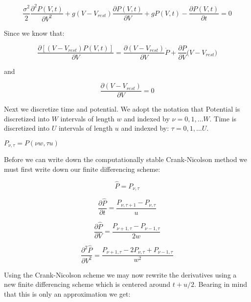 \documentclass[10pt]{article}
\begin{document}
\begin{equation}
    \frac{\sigma^2}{2} \frac{\partial^2 P(V,t) } {\partial V^2} +
    g(V-V_{rest})\frac{\partial P(V,t)}{\partial V} +
    gP(V,t) -
    \frac{\partial P(V,t)}{\partial t} = 
    0
\end{equation}

Since we know that:

\begin{equation}
    \frac{\partial[(V-V_{rest})P(V,t)]}{\partial V} =
    \frac{\partial (V-V_{rest})}{\partial V} \dot P +
    \frac{\partial P}{\partial V} \dot (V-V_{rest})
\end{equation}

and

\begin{equation}
    \frac{\partial (V-V_{rest})}{\partial V} = 0 
\end{equation}


Next we discretize time and potential. We adopt the notation that
Potential is discretized into $W$ intervals of length $w$ and indexed
by $\nu= 0,1, \dots W $.  Time is discretized  into $U$ intervals of
length $u$ and indexed by: $\tau= 0,1, \dots U $.



$P_{\nu,\tau} = P(\nu w,\tau u)$

Before we can write down the computationally stable Crank-Nicolson
method we must first write down our finite differencing scheme:

\begin{equation}
    \hat{P} = P_{\nu,\tau}
\end{equation}

\begin{equation}
    \frac{\partial \hat{P}}{\partial t} = \frac{P_{\nu,\tau +1 } -
    P_{\nu,\tau}}{u}
\end{equation}

\begin{equation}
    \frac{\partial \hat{P}}{\partial V} = 
    \frac{P_{\nu +1,\tau } -
    P_{\nu - 1,\tau } }
    {2w}
\end{equation}

\begin{equation}
    \frac{\partial^2 \hat{P}}{\partial V^2} = 
    \frac{P_{\nu+1,\tau} - 2 P_{\nu,\tau} + P_{\nu-1,\tau}}
    {w^2}
\end{equation}


Using the Crank-Nicolson scheme we  may now rewrite the derivatives
using a new finite differencing scheme which is centered around $t +
u/2$. Bearing in mind that this is only
an approximation we get:
\end{document}
